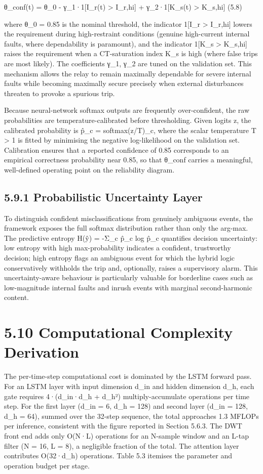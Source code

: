 θ\_conf(t) = θ\_0 - γ\_1·1[I\_r(t) > I\_r,hi] + γ\_2·1[K\_s(t) > K\_s,hi]	(5.8)

where θ\_0 = 0.85 is the nominal threshold, the indicator 1[I\_r > I\_r,hi] lowers the requirement during high-restraint conditions (genuine high-current internal faults, where dependability is paramount), and the indicator 1[K\_s > K\_s,hi] raises the requirement when a CT-saturation index K\_s is high (where false trips are most likely). The coefficients γ\_1, γ\_2 are tuned on the validation set. This mechanism allows the relay to remain maximally dependable for severe internal faults while becoming maximally secure precisely when external disturbances threaten to provoke a spurious trip.

Because neural-network softmax outputs are frequently over-confident, the raw probabilities are temperature-calibrated before thresholding. Given logits z, the calibrated probability is p̂\_c = softmax(z/T)\_c, where the scalar temperature T > 1 is fitted by minimising the negative log-likelihood on the validation set. Calibration ensures that a reported confidence of 0.85 corresponds to an empirical correctness probability near 0.85, so that θ\_conf carries a meaningful, well-defined operating point on the reliability diagram.


\subsection{5.9.1  Probabilistic Uncertainty Layer}
To distinguish confident misclassifications from genuinely ambiguous events, the framework exposes the full softmax distribution rather than only the arg-max. The predictive entropy H(ŷ) = -Σ\_c p̂\_c log p̂\_c quantifies decision uncertainty: low entropy with high max-probability indicates a confident, trustworthy decision; high entropy flags an ambiguous event for which the hybrid logic conservatively withholds the trip and, optionally, raises a supervisory alarm. This uncertainty-aware behaviour is particularly valuable for borderline cases such as low-magnitude internal faults and inrush events with marginal second-harmonic content.


\section{5.10  Computational Complexity Derivation}
The per-time-step computational cost is dominated by the LSTM forward pass. For an LSTM layer with input dimension d\_in and hidden dimension d\_h, each gate requires 4·(d\_in·d\_h + d\_h²) multiply-accumulate operations per time step. For the first layer (d\_in = 6, d\_h = 128) and second layer (d\_in = 128, d\_h = 64), summed over the 32-step sequence, the total approaches 1.3 MFLOPs per inference, consistent with the figure reported in Section 5.6.3. The DWT front end adds only O(N·L) operations for an N-sample window and an L-tap filter (N = 16, L = 8), a negligible fraction of the total. The attention layer contributes O(32·d\_h) operations. Table 5.3 itemises the parameter and operation budget per stage.

